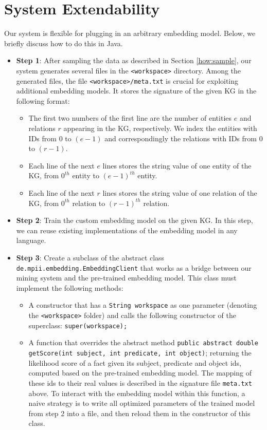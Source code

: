 \section{System Extendability}
Our system is flexible for plugging in an arbitrary embedding model. Below, we briefly discuss how to do this in Java.
\begin{itemize}
\item \textbf{Step 1}: After sampling the data as described in Section \ref{how:sample}, our system generates several files in the \texttt{<workspace>} directory. Among the generated files, the file \texttt{<workspace>/meta.txt} is crucial for exploiting additional embedding models. It stores the signature of the given KG in the following format:
\begin{itemize}
\item The first two numbers of the first line are the number of entities $e$ and relations $r$ appearing in the KG, respectively. We index the entities with IDs from $0$ to $(e-1)$ and correspondingly the relations with IDs from $0$ to $(r-1)$.
\item Each line of the next $e$ lines stores the string value of one entity of the KG, from $0^{th}$ entity to $(e-1)^{th}$ entity.
\item Each line of the next $r$ lines stores the string value of one relation of the KG, from $0^{th}$ relation to $(r-1)^{th}$ relation.
\end{itemize}
\item \textbf{Step 2}: Train the custom embedding model on the given KG. In this step, we can reuse existing implementations of the embedding model in any language.
\item \textbf{Step 3}: Create a subclass of the abstract class \texttt{de.mpii.embedding.EmbeddingClient} that works as a bridge between our mining system and the pre-trained embedding model. This class must implement the following methods:
\begin{itemize}
\item A constructor that has a \texttt{String workspace} as one parameter (denoting the \texttt{<workspace>} folder) and calls the following constructor of the superclass: \texttt{super(workspace);}
\item A function that overrides the abstract method \texttt{public abstract double getScore(int subject, int predicate, int object)}; returning the likelihood score of a fact given its subject, predicate and object ids, computed based on the pre-trained embedding model. The mapping of these ids to their real values is described in the signature file \texttt{meta.txt} above. To interact with the embedding model within this function, a naive strategy is to write all optimized parameters of the trained model from step 2 into a file, and then reload them in the constructor of this class.

\end{itemize}
\end{itemize}
